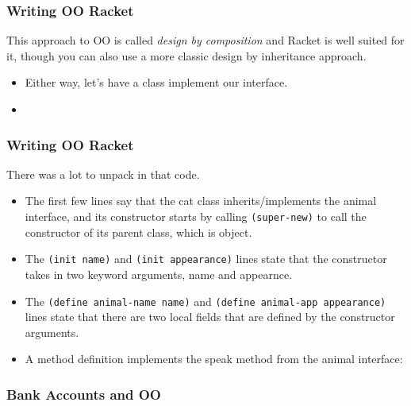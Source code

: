 \documentclass{beamer}
\begin{document}

\begin{frame}
  \frametitle{Writing OO Racket}
    This approach to OO is called \emph{design by composition} and
    Racket is well suited for it, though you can also use a more classic
    design by inheritance approach.
    \begin{itemize}
    \item<2-> Either way, let's have a class implement our interface.
    \item<3-> \catClass
    \end{itemize}
\end{frame}

\begin{frame}
  \frametitle{Writing OO Racket}
  There was a lot to unpack in that code.
  \begin{itemize}
  \item<2-> The first few lines say that the cat class inherits/implements
    the animal interface, and its constructor starts by calling
    \texttt{(super-new)} to call the constructor of its
    parent class, which is object.
  \item<3-> The \texttt{(init name)} and \texttt{(init appearance)} lines state that the constructor takes in two keyword arguments, name and appearnce.
  \item<4-> The \texttt{(define animal-name name)}
    and \texttt{(define animal-app appearance)} lines
    state that there are two local fields that are defined by the constructor
    arguments.
  \item<6-> A method definition implements the speak method from the animal
    interface: \speak
  \end{itemize}
\end{frame}

\begin{frame}
  \frametitle{Bank Accounts and OO}
  \account
\end{frame}
\end{document}
